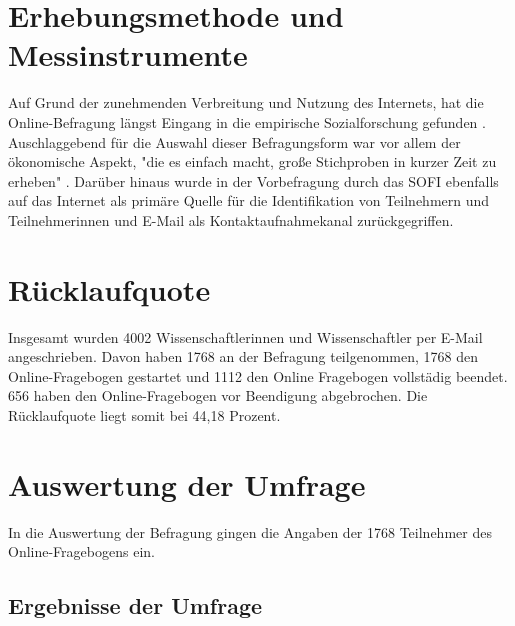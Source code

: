 \section{Erhebungsmethode und Messinstrumente}

Auf Grund der zunehmenden Verbreitung und Nutzung des Internets, hat die Online-Befragung längst Eingang in die empirische Sozialforschung gefunden \cite{Pannewitz_2002}. Auschlaggebend für die Auswahl dieser Befragungsform war vor allem der ökonomische Aspekt, "die es einfach macht, große Stichproben in kurzer Zeit zu erheben" \cite{eichhorn_2004_online}. Darüber hinaus wurde in der Vorbefragung durch das SOFI ebenfalls auf das Internet als primäre Quelle für die Identifikation von Teilnehmern und Teilnehmerinnen und E-Mail als Kontaktaufnahmekanal zurückgegriffen.

\section{Rücklaufquote}  
Insgesamt wurden 4002 Wissenschaftlerinnen und Wissenschaftler per E-Mail angeschrieben. Davon haben 1768 an der Befragung teilgenommen, 1768 den Online-Fragebogen gestartet und 1112 den Online Fragebogen vollstädig beendet. 656 haben den Online-Fragebogen vor Beendigung abgebrochen. Die Rücklaufquote liegt somit bei 44,18 Prozent. 


\section{Auswertung der Umfrage}

In die Auswertung der Befragung gingen die Angaben der 1768 Teilnehmer des Online-Fragebogens ein.

\subsection{Ergebnisse der Umfrage}